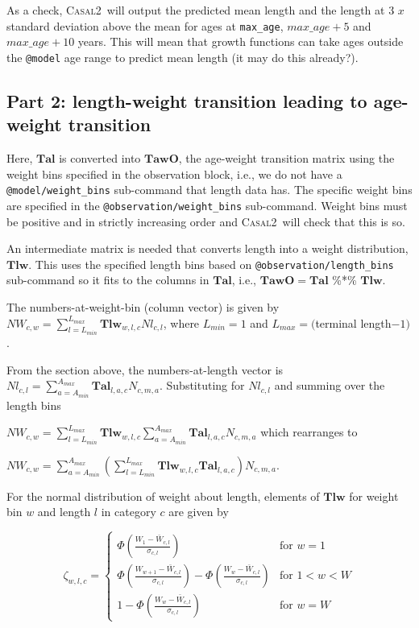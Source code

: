 \documentclass[a4paper,11pt,twoside,pdftex,draft]{article}
\newcommand{\CNAME}{\textsc{Casal2}}
\begin{document}
As a check, \CNAME~will output the predicted mean length and the length at 3 $x$ standard deviation above the mean for ages at  \texttt{max\_age}, $max\_age + 5$ and $max\_age + 10$ years. This will mean that growth functions can take ages outside the \texttt{@model} age range to predict mean length (it may do this already?). 


\subsection{Part 2: length-weight transition leading to age-weight transition}
Here, $\mathbf{Tal}$ is converted into $\mathbf{TawO}$, the age-weight transition matrix  using the weight bins specified in the observation block, i.e., we do not have a
\texttt{@model/weight\_bins} sub-command that length data has. The specific weight bins are specified in the \texttt{@observation/weight\_bins} sub-command.
 Weight bins must be positive and in strictly increasing order and \CNAME~will check that this is so.

An intermediate matrix is needed that converts length into a weight distribution, $\mathbf{Tlw}$. This uses the specified length bins based on \texttt{@observation/length\_bins} sub-command so it fits to the columns in $\mathbf{Tal}$, i.e., $\mathbf{TawO} =\mathbf{Tal} $ \%*\% $ \mathbf{Tlw} $.

The numbers-at-weight-bin (column vector) is given by $NW_{c,w} = \sum_{l=L_{min}}^{L_{max}}  \mathbf{Tlw}_{w,l,c} Nl_{c,l}$, where $L_{min} = 1$ and $L_{max} = ($terminal length$ - 1)$.

From the section above, the numbers-at-length vector is $Nl_{c,l} = \sum_{a=A_{min}}^{A_{max}}  \mathbf{Tal}_{l,a,c} N_{c,m,a}$. Substituting for $Nl_{c,l}$ and summing over the length bins

$NW_{c,w} = \sum_{l=L_{min}}^{L_{max}}  \mathbf{Tlw}_{w,l,c} \sum_{a=A_{min}}^{A_{max}}  \mathbf{Tal}_{l,a,c} N_{c,m,a}$ which rearranges to 

$NW_{c,w} = \sum_{a=A_{min}}^{A_{max}} \left( \sum_{l=L_{min}}^{L_{max}}  \mathbf{Tlw}_{w,l,c}  \mathbf{Tal}_{l,a,c}\right) N_{c,m,a}$. 

For the normal distribution of weight about length, 
elements of $\mathbf{Tlw}$ for weight bin $w$ and length $l$ in category $c$ are given by

\begin{equation}
\zeta_{w,l,c} =
\begin{cases}
\Phi\left( \frac{W_{1} - \bar W_{c,l}   }{\sigma_{c,l}} \right) & \text{for } w = 1 \\

\Phi\left( \frac{W_{w+1} - \bar W_{c,l}   }{\sigma_{c,l}} \right)   - \Phi\left( \frac{W_{w} - \bar W_{c,l}   }{\sigma_{c,l}} \right) & \text{for } 1 < w < W \\

1 - \Phi\left( \frac{W_{w} - \bar W_{c,l}   }{\sigma_{c,l}} \right) & \text{for } w = W
\end{cases}
\end{equation}
\end{document}
